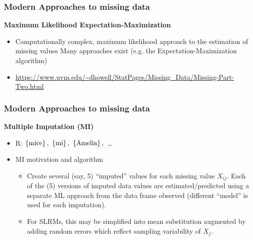 \documentclass{beamer}
\begin{document}

\begin{frame}
\frametitle{Modern Approaches to missing data}

\textbf{Maximum Likelihood Expectation-Maximization}
  \begin{itemize}
  \item Computationally complex, maximum likelihood approach to the estimation of missing values Many approaches exist (e.g. the Expectation-Maximization algorithm)
  \item[] \scriptsize{\url{https://www.uvm.edu/~dhowell/StatPages/Missing_Data/Missing-Part-Two.html}}
   \end{itemize}
 
\end{frame}




\begin{frame}
\frametitle{Modern Approaches to missing data}

\textbf{Multiple Imputation (MI) }
  \begin{itemize}
  \item[] R: $\left\lbrace \textnormal{mice}  \right\rbrace , \,\, \left\lbrace \textnormal{mi}  \right\rbrace, \,\, \left\lbrace \textnormal{Amelia}  \right\rbrace, \, $ \dots
  \vspace{0.5cm}
  \item[] MI motivation and algorithm
  \vspace{0.2cm}
  \begin{itemize}
  \item Create several (say, 5) “imputed” values for each missing value $X_{ij}$. Each of the (5) versions of imputed data values are estimated/predicted using a separate ML approach from the data frame observed (different “model” is used for each imputation).
  \vspace{0.2cm}
  \item For SLRMs, this may be simplified into mean substitution augmented by adding random errors which reflect sampling variability of $X_j$.
  \end{itemize}
 \end{itemize}
 
\end{frame}


\end{document}
